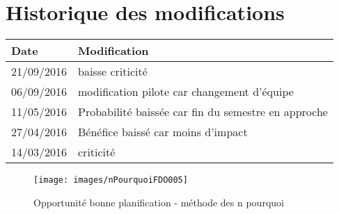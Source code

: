 \section*{Historique des modifications}
\begin{table}[h]
\centering
	\begin{tabularx}{16.8cm}{|X|X|}
	\hline
	\rowcolor{gray!40} Date & Modification \\%
	\hline
	 21/09/2016 & baisse criticité \\
	\hline
	 06/09/2016 & modification pilote car changement d'équipe \\
	\hline
	 11/05/2016 & Probabilité baissée car fin du semestre en approche \\
	\hline
	 27/04/2016 & Bénéfice baissé car moins d'impact \\
	\hline
	 14/03/2016 & criticité \\
	\hline
	\end{tabularx}
\end{table}
\newpage


\begin{figure}
	\centering
	\texttt{[image: images/nPourquoiFDO005]}
	\caption{\label{opportunite bonne planification}Opportunité bonne planification - méthode des n pourquoi}
\end{figure}
